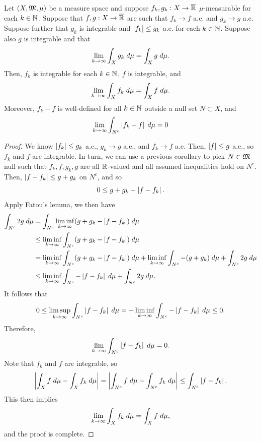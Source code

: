 \documentclass[a4paper]{article}
\begin{document}
\begin{thm}
Let $(X, \mathfrak{M}, \mu)$ be a measure space and suppose 
$f_k, g_k : X \to \overline{\mathbb{R}}$ $\mu$-measurable for each
$k \in \mathbb{N}$. Suppose that $f, g: X \to \overline{\mathbb{R}}$ are such that 
$f_k \to f$ a.e. and $g_k \to g$ a.e. Suppose further that 
$g_k$ is integrable and $\left\lvert f_k\right\rvert \leq g_k$ a.e. 
for each $k \in \mathbb{N}$. Suppose also $g$ is integrable and that 
\[
\lim_{k \to \infty} \int_X g_k \; d \mu = 
\int_X g \; d \mu.
\]
Then, $f_k$ is integrable for each $k \in \mathbb{N}$, 
$f$ is integrable, and 
\[
\lim_{k \to \infty} \int_X f_k \; d \mu = \int_X f \; d \mu.
\]
Moreover, $f_k - f$ is well-defined for all $k \in \mathbb{N}$ 
outside a null set $N \subset X$, and 
\[
\lim_{k \to \infty} \int_{N^c} \left\lvert f_k - f\right\rvert \; d \mu = 0
\]
\end{thm}

\begin{proof}
We know $\left\lvert f_k\right\rvert \leq g_k$ a.e., $g_k \to g$ a.e., 
and $f_k \to f$ a.e. Then, $\left\lvert f\right\rvert \leq g$ a.e., 
so $f_k$ and $f$ are integrable. 
In turn, we can use a previous corollary to pick $N \in \mathfrak{M}$
null such that $f_k, f, g_k, g$ are all $\mathbb{R}$-valued 
and all assumed inequalities hold on $N^c$. 
Then, $\left\lvert f - f_k\right\rvert \leq g + g_k$ on $N^c$, and so 
\[
0 \leq g + g_k - \left\lvert f - f_k\right\rvert.
\]
Apply Fatou's lemma, we then have 
\[
\begin{aligned}
\int_{N^c} 2g \; d \mu 
&= \int_{N^c} \liminf_{k \to \infty} (g + g_k - \left\lvert f - f_k\right\rvert) 
\; d \mu  \\
&\leq \liminf_{k \to \infty} \int_{N^c} (g + g_k - \left\lvert f - f_k\right\rvert)
\; d \mu \\
&= \liminf_{k \to \infty} \int_{N^c} (g + g_k - \left\lvert f - f_k\right\rvert)
\; d \mu + \liminf_{k \to \infty} \int_{N^c} -(g + g_k) \; d \mu 
+ \int_{N^c} 2g \; d \mu \\
&\leq \liminf_{k \to \infty} \int_{N^c} - \left\lvert f - f_k\right\rvert \; d \mu
+ \int_{N^c} 2g \; d \mu.
\end{aligned}
\]
It follows that
\[
0 \leq \limsup_{k \to \infty} \int_{N^c} \left\lvert f - f_k\right\rvert \; d \mu
= - \liminf_{k \to \infty} \int_{N^c} - \left\lvert f - f_k\right\rvert \; d \mu
\leq 0.
\]
Therefore, 
\[
\lim_{k \to \infty} \int_{N^c} \left\lvert f - f_k\right\rvert \; d \mu = 0.
\]
Note that $f_k$ and $f$ are integrable, so 
\[
\left\lvert \int_X f \; d \mu - \int_X f_k \; d \mu\right\rvert 
= \left\lvert \int_{N^c} f \; d \mu - \int_{N^c} f_k \; d \mu\right\rvert 
\leq \int_{N^c} \left\lvert f - f_k\right\rvert.
\]
This then implies 
\[
\lim_{k \to \infty} \int_X f_k \; d \mu = \int_X f \; d \mu,
\]
and the proof is complete.
\end{proof}
\end{document}
